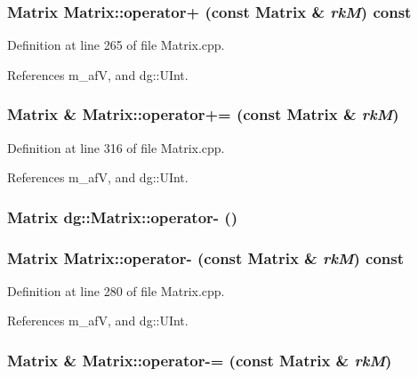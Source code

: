 \subsubsection{\setlength{\rightskip}{0pt plus 5cm}Matrix Matrix::operator+ (const Matrix \& {\em rk\-M}) const}\label{classdg_1_1Matrix_a15}




Definition at line 265 of file Matrix.cpp.

References m\_\-af\-V, and dg::UInt.
\subsubsection{\setlength{\rightskip}{0pt plus 5cm}Matrix \& Matrix::operator+= (const Matrix \& {\em rk\-M})}\label{classdg_1_1Matrix_a21}




Definition at line 316 of file Matrix.cpp.

References m\_\-af\-V, and dg::UInt.
\subsubsection{\setlength{\rightskip}{0pt plus 5cm}Matrix dg::Matrix::operator- ()}\label{classdg_1_1Matrix_a20}


\subsubsection{\setlength{\rightskip}{0pt plus 5cm}Matrix Matrix::operator- (const Matrix \& {\em rk\-M}) const}\label{classdg_1_1Matrix_a16}




Definition at line 280 of file Matrix.cpp.

References m\_\-af\-V, and dg::UInt.
\subsubsection{\setlength{\rightskip}{0pt plus 5cm}Matrix \& Matrix::operator-= (const Matrix \& {\em rk\-M})}\label{classdg_1_1Matrix_a22}




